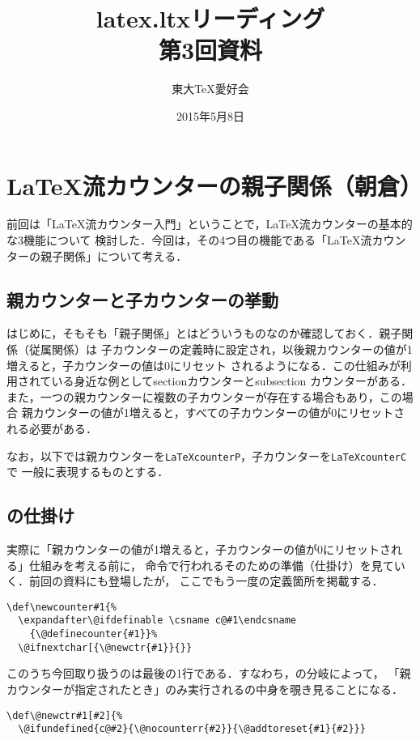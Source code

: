 \documentclass[autodetect-engine,dvipdfmx]{jsarticle}
\begin{document}
\title{ latex.ltxリーディング \\ 第3回資料 }
\author{ 東大\TeX 愛好会 }
\date{2015年5月8日}
\maketitle

\section{\LaTeX 流カウンターの親子関係（朝倉）}

前回は「\LaTeX 流カウンター入門」ということで，\LaTeX 流カウンターの基本的な3機能について
検討した．今回は，その4つ目の機能である「\LaTeX 流カウンターの親子関係」について考える．

\subsection{親カウンターと子カウンターの挙動}

はじめに，そもそも「親子関係」とはどういうものなのか確認しておく．親子関係（従属関係）は
子カウンターの定義時に設定され，以後親カウンターの値が1増えると，子カウンターの値は0にリセット
されるようになる．この仕組みが利用されている身近な例としてsectionカウンターとsubsection
カウンターがある．また，一つの親カウンターに複数の子カウンターが存在する場合もあり，この場合
親カウンターの値が1増えると，すべての子カウンターの値が0にリセットされる必要がある．

なお，以下では親カウンターを\texttt{LaTeXcounterP}，子カウンターを\texttt{LaTeXcounterC}で
一般に表現するものとする．

\subsection{の仕掛け}

実際に「親カウンターの値が1増えると，子カウンターの値が0にリセットされる」仕組みを考える前に，
命令で行われるそのための準備（仕掛け）を見ていく．前回の資料にも登場したが，
ここでもう一度の定義箇所を掲載する．
\latexltx
\begin{lstlisting}[firstnumber=1819]
\def\newcounter#1{%
  \expandafter\@ifdefinable \csname c@#1\endcsname
    {\@definecounter{#1}}%
  \@ifnextchar[{\@newctr{#1}}{}}
\end{lstlisting}

このうち今回取り扱うのは最後の1行である．すなわち，の分岐によって，
「親カウンターが指定されたとき」のみ実行されるの中身を覗き見ることになる．
\begin{lstlisting}[firstnumber=1824]
\def\@newctr#1[#2]{%
  \@ifundefined{c@#2}{\@nocounterr{#2}}{\@addtoreset{#1}{#2}}}
\end{lstlisting}
\end{document}
